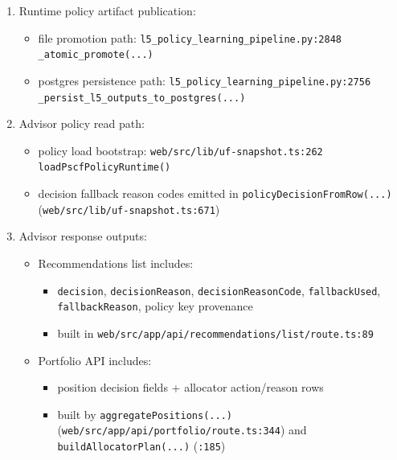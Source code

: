 \documentclass[
]{article}
\providecommand{\tightlist}{%
  \setlength{\itemsep}{0pt}\setlength{\parskip}{0pt}}
\begin{document}
\begin{enumerate}
\def\labelenumi{\arabic{enumi}.}
\item
  Runtime policy artifact publication:

  \begin{itemize}
  \tightlist
  \item
    file promotion path: \texttt{l5\_policy\_learning\_pipeline.py:2848}
    \texttt{\_atomic\_promote(...)}
  \item
    postgres persistence path:
    \texttt{l5\_policy\_learning\_pipeline.py:2756}
    \texttt{\_persist\_l5\_outputs\_to\_postgres(...)}
  \end{itemize}
\item
  Advisor policy read path:

  \begin{itemize}
  \tightlist
  \item
    policy load bootstrap: \texttt{web/src/lib/uf-snapshot.ts:262}
    \texttt{loadPscfPolicyRuntime()}
  \item
    decision fallback reason codes emitted in
    \texttt{policyDecisionFromRow(...)}
    (\texttt{web/src/lib/uf-snapshot.ts:671})
  \end{itemize}
\item
  Advisor response outputs:

  \begin{itemize}
  \tightlist
  \item
    Recommendations list includes:

    \begin{itemize}
    \tightlist
    \item
      \texttt{decision}, \texttt{decisionReason},
      \texttt{decisionReasonCode}, \texttt{fallbackUsed},
      \texttt{fallbackReason}, policy key provenance
    \item
      built in \texttt{web/src/app/api/recommendations/list/route.ts:89}
    \end{itemize}
  \item
    Portfolio API includes:

    \begin{itemize}
    \tightlist
    \item
      position decision fields + allocator action/reason rows
    \item
      built by \texttt{aggregatePositions(...)}
      (\texttt{web/src/app/api/portfolio/route.ts:344}) and
      \texttt{buildAllocatorPlan(...)} (\texttt{:185})
    \end{itemize}
  \end{itemize}
\end{enumerate}
\end{document}
